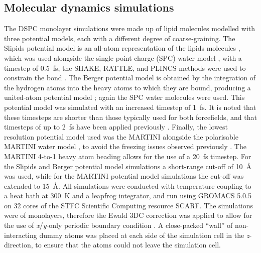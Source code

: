 \subsection{Molecular dynamics simulations}
The DSPC monolayer simulations were made up of lipid molecules modelled with three potential models, each with a different degree of coarse-graining.
The Slipids potential model is an all-atom representation of the lipids molecules \cite{jambeck_derivation_2012}, which was used alongside the single point charge (SPC) water model \cite{berendsen_missing_1987}, with a timestep of \SI{0.5}{\femto\second}, the SHAKE, RATTLE, and PLINCS methods were used to constrain the  bond \cite{miyamoto_settle_1992,hess_p-lincs_2008}.
The Berger potential model is obtained by the integration of the hydrogen atoms into the heavy atoms to which they are bound, producing a united-atom potential model \cite{berger_molecular_1997}; again the SPC water molecules were used.
This potential model was simulated with an increased timestep of \SI{1}{\femto\second}.
It is noted that these timesteps are shorter than those typically used for both forcefields, and that timesteps of up to \SI{2}{\femto\second} have been applied previously \cite{berger_molecular_1997,jambeck_derivation_2012}.
Finally, the lowest resolution potential model used was the MARTINI \cite{marrink_martini_2007} alongside the polarisable MARTINI water model \cite{yesylevskyy_polarizable_2010}, to avoid the freezing issues observed previously \cite{koutsioubas_combined_2016}.
The MARTINI 4-to-1 heavy atom beading allows for the use of a \SI{20}{\femto\second} timestep.
For the Slipids and Berger potential model simulations a short-range cut-off of \SI{10}{\angstrom} was used, while for the MARTINI potential model simulations the cut-off was extended to \SI{15}{\angstrom}.
All simulations were conducted with temperature coupling to a heat bath at \SI{300}{\kelvin} and a leapfrog integrator, and run using GROMACS 5.0.5 \cite{berendsen_gromacs_1995,lindahl_gromacs_2001,van_der_spoel_gromacs_2005,hess_gromacs_2008} on 32 cores of the STFC Scientific Computing resource SCARF.
The simulations were of monolayers, therefore the Ewald 3DC correction was applied to allow for the use of \emph{x}/\emph{y}-only periodic boundary condition \cite{yeh_ewald_1999}.
A close-packed ``wall'' of non-interacting dummy atoms was placed at each side of the simulation cell in the \emph{z}-direction, to ensure that the atoms could not leave the simulation cell.

